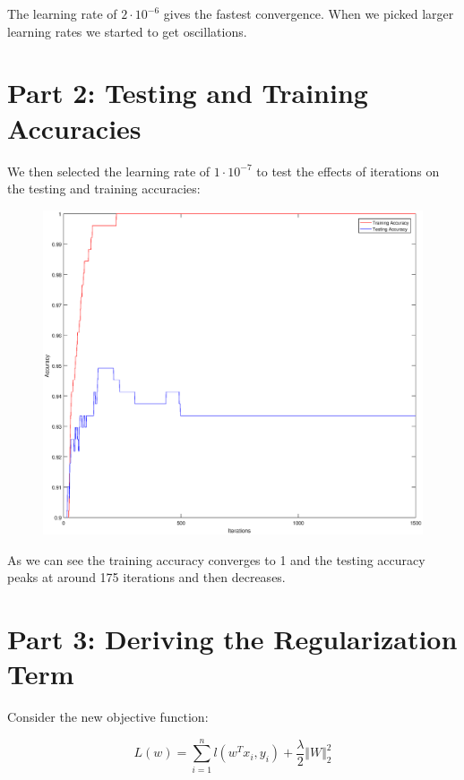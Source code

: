 \documentclass{article}
\begin{document}
	The learning rate of $2 \cdot 10^{-6}$ gives the fastest convergence. When we picked larger learning rates we started to get oscillations.
	
	\section*{Part 2: Testing and Training Accuracies}
	
	We then selected the learning rate of $1 \cdot 10^{-7}$ to test the effects of iterations on the testing and training accuracies:
	\newpage
	
	\begin{figure}[h!]
		\begin{center} 
			\includegraphics[scale=0.5]{iter_accuracy.eps} 
		\end{center}  
		\label{fig:M2}
	\end{figure}

As we can see the training accuracy converges to 1 and the testing accuracy peaks at around 175 iterations and then decreases.

	\section*{Part 3: Deriving the Regularization Term}
Consider the new objective function:
	
	$$
	L(w) = \sum_{i = 1}^{n} l(w^{T} x_{i}, y_{i}) + \frac{\lambda}{2} \Vert W \Vert_{2}^{2}
	$$
	
\end{document}
